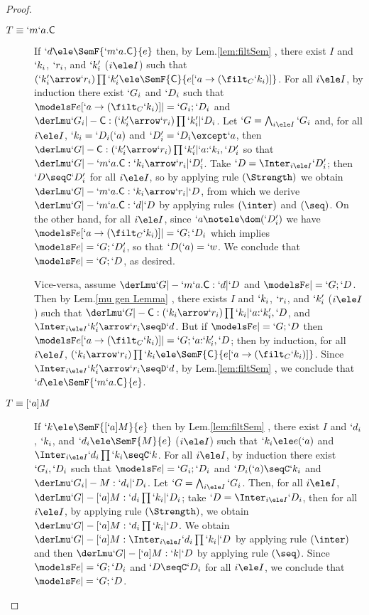 \documentclass{CSML}
\begin{document}
\begin{proof}
\begin{description}
 \item [$ T\equiv `m`a.\textrm{\sf C} $] 
If $`d \ele \SemF { `m`a.\Cmd}{ e }$ then, by Lem.\skp\ref{lem:filtSem}%
, there exist $I$ and $`k_i$, $`r_i$, and $`k'_i$ ($i \ele I$) such that $(`k'_i\arrow `r_i)\prod `k'_i \ele \SemF { \Cmd}{ e[`a\to (\filt_C `k_i)] }$. 
For all $i \ele I$, by induction there exist $`G_i$ and $`D_i$ 
such that $\modelsF e[`a\to (\filt_C `k_i)] |= `G_i;`D_i$ and $ \derLmu `G_i |- {\Cmd} : (`k'_i\arrow `r_i)\prod `k'_i | `D_i $. 
Let $`G=\bigwedge_{i\ele I}`G_i$ and, for all $i \ele I$, $`k_i = `D_i(`a)$ and $`D'_i = `D_i\except`a$, then $ \derLmu `G |- {\Cmd} : (`k'_i\arrow `r_i)\prod `k'_i | `a{:}`k_i,`D'_i $ so that $ \derLmu `G |- `m`a.{\Cmd} : `k_i\arrow `r_i | `D'_i $. 
Take $`D = \Inter_{i \ele I} `D'_i$; then $`D\seqC `D'_i$ for all $i \ele I$, so by applying rule $(\Strength)$ we obtain $ \derLmu `G |- {`m`a.\Cmd} : `k_i\arrow `r_i | `D $, from which we derive $ \derLmu `G |- {`m`a.\Cmd} : `d | `D $ by applying rules $(\inter)$ and $(\seq)$.
On the other hand, for all $i \ele I$, since $`a\notele \dom(`D'_i)$ we have $\modelsF e[`a\to (\filt_C `k_i)] |= `G;`D_i$ which implies $\modelsF e |= `G;`D'_i$, so that $`D(`a) = `w$. We conclude that $\modelsF e |= `G;`D $, as desired.
	
Vice-versa, assume $ \derLmu `G |- {`m`a.\Cmd} : `d | `D $ and $\modelsF e |= `G;`D $.
Then by Lem.\skp\ref{mu gen Lemma}%
, there exists $I$ and $`k_i$, $`r_i$, and $`k'_i$ ($i \ele I$) such that $ \derLmu `G |- {\Cmd} : (`k_i\arrow `r_i)\prod `k_i | `a{:}`k'_i,`D $, and $\Inter_{i \ele I}`k'_i\arrow `r_i \seqD `d$. 
But if $\modelsF e |= `G;`D $ then $\modelsF e[`a\to (\filt_C `k_i)] |= `G;`a{:}`k'_i,`D $; 
then by induction, for all $i \ele I$, $(`k_i\arrow `r_i)\prod `k_i \ele \SemF { \Cmd}{ e[`a\to (\filt_C `k_i)] }$. 
Since $\Inter_{i \ele I}`k'_i\arrow `r_i \seqD `d$, by Lem.\skp\ref{lem:filtSem}%
, we conclude that $`d \ele \SemF { `m`a.\Cmd}{ e }$.
	
 \item [$ {T\equiv [`a]M} $] 
If $`k \ele \SemF { [`a]M}{ e }$ then by Lem.\skp\ref{lem:filtSem}%
, there exist $I$ and $`d_i$, $`k_i$, and $`d_i \ele \SemF { M }{ e }$ ($i \ele I$) such that $`k_i \ele e(`a)$ and $\Inter_{i \ele I}`d_i\prod `k_i \seqC `k$.
For all $i \ele I$, by induction there exist $`G_i,`D _i$ 
such that $\modelsF e |= `G_i;`D_i$ and $`D_i(`a) \seqC `k_i$ and $ \derLmu `G_i |- M : `d_i | `D_i $. Let $`G=\bigwedge_{i\ele I}`G_i$.
Then, for all $i \ele I$, $ \derLmu `G |- [`a]M : `d_i\prod `k_i | `D_i $; take $`D = \Inter_{i \ele I}`D_i$, then for all $i \ele I$, by applying rule $(\Strength)$, we obtain $ \derLmu `G |- [`a]M : `d_i\prod `k_i | `D $. 
We obtain $ \derLmu `G |- [`a]M : \Inter_{i \ele I}`d_i\prod `k_i | `D $ by applying rule $(\inter)$ and then $ \derLmu `G |- [`a]M : `k | `D $ by applying rule $(\seq)$. 
Since $\modelsF e |= `G;`D_i$ and $`D \seqC `D_i$ for all $i \ele I$, we conclude that $\modelsF e |= `G;`D $.
	

\end{description}
\end{proof}
\end{document}
